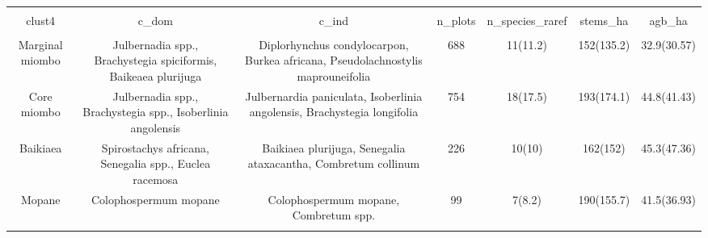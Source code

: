 
\begin{table}[!htbp] \centering 
  \caption{} 
  \label{clust_summ} 
\begin{tabular}{@{\extracolsep{5pt}} ccccccc} 
\\[-1.8ex]\hline 
\hline \\[-1.8ex] 
clust4 & c\_dom & c\_ind & n\_plots & n\_species\_raref & stems\_ha & agb\_ha \\ 
\hline \\[-1.8ex] 
Marginal miombo & Julbernadia spp., Brachystegia spiciformis, Baikeaea plurijuga & Diplorhynchus condylocarpon, Burkea africana, Pseudolachnostylis maprouneifolia & 688 & 11(11.2) & 152(135.2) & 32.9(30.57) \\ 
Core miombo & Julbernadia spp., Brachystegia spp., Isoberlinia angolensis & Julbernardia paniculata, Isoberlinia angolensis, Brachystegia longifolia & 754 & 18(17.5) & 193(174.1) & 44.8(41.43) \\ 
Baikiaea & Spirostachys africana, Senegalia spp., Euclea racemosa & Baikiaea plurijuga, Senegalia ataxacantha, Combretum collinum & 226 & 10(10) & 162(152) & 45.3(47.36) \\ 
Mopane & Colophospermum mopane & Colophospermum mopane, Combretum spp. & 99 & 7(8.2) & 190(155.7) & 41.5(36.93) \\ 
\hline \\[-1.8ex] 
\end{tabular} 
\end{table} 

